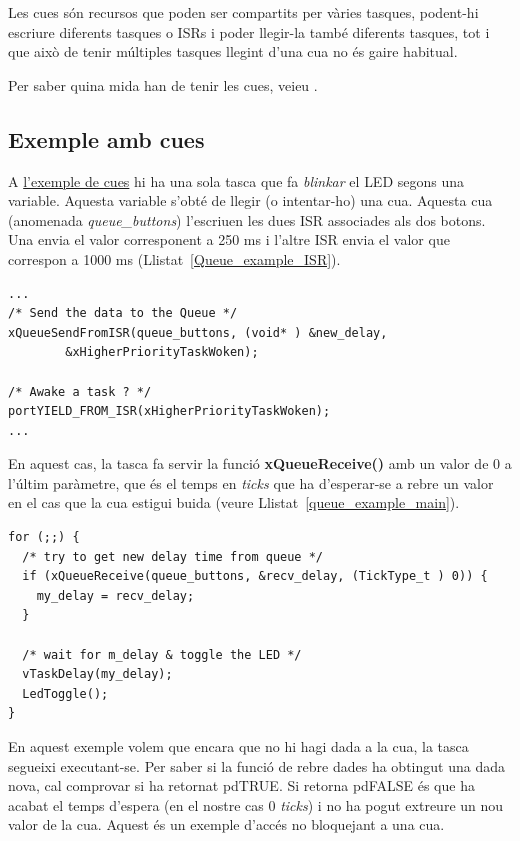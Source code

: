 Les cues són recursos que poden ser compartits per vàries tasques, podent-hi escriure diferents tasques o \glspl{ISR} i poder llegir-la també diferents tasques, tot i que això de tenir múltiples tasques llegint d'una cua no és gaire habitual.

Per saber quina mida han de tenir les cues, veieu .
\subsection{Exemple amb cues}
\label{sub:cues_exemple}
A \href{https://github.com/mariusmm/cursembedded/tree/master/Simplicity/FreeRTOS_Queue}{l'exemple de cues} hi ha una sola tasca que fa {\em blinkar} el \gls{LED} segons una variable. Aquesta variable s'obté de llegir (o intentar-ho) una cua. Aquesta cua (anomenada {\em queue\_buttons}) l'escriuen les dues \gls{ISR} associades als dos botons. Una envia el valor corresponent a 250 ms i l'altre ISR envia el valor que correspon a 1000 ms (Llistat~\ref{Queue_example_ISR}).

\begin{lstlisting}[style=customc, label=Queue_example_ISR, caption=Part del codi d'una de les ISRs]
...
/* Send the data to the Queue */
xQueueSendFromISR(queue_buttons, (void* ) &new_delay,
		&xHigherPriorityTaskWoken);

/* Awake a task ? */
portYIELD_FROM_ISR(xHigherPriorityTaskWoken);
...
\end{lstlisting}


En aquest cas, la tasca fa servir la funció {\bf xQueueReceive()} amb un valor de 0 a l'últim paràmetre, que és el temps en {\em ticks} que ha d'esperar-se a rebre un valor en el cas que la cua estigui buida (veure Llistat~\ref{queue_example_main}).

\begin{lstlisting}[style=customc,label=queue_example_main, caption=Part principal de la tasca TaskLedToggle]
for (;;) {
  /* try to get new delay time from queue */
  if (xQueueReceive(queue_buttons, &recv_delay, (TickType_t ) 0)) {
    my_delay = recv_delay;
  }

  /* wait for m_delay & toggle the LED */
  vTaskDelay(my_delay);
  LedToggle();
}
\end{lstlisting}

En aquest exemple volem que encara que no hi hagi dada a la cua, la tasca segueixi executant-se. Per saber si la funció de rebre dades ha obtingut una dada nova, cal comprovar si ha retornat \gls{pdTRUE}. Si retorna \gls{pdFALSE} és que ha acabat el temps d'espera (en el nostre cas 0 {\em ticks}) i no ha pogut extreure un nou valor de la cua. Aquest és un exemple d'accés no bloquejant a una cua.

